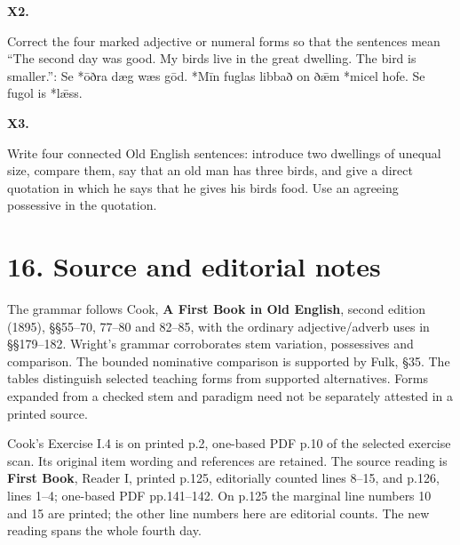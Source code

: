 \par\begin{minipage}{\linewidth}\raggedright
\textbf{X2.}

Correct the four marked adjective or numeral forms so that the sentences mean “The second day was good. My birds live in the great dwelling. The bird is smaller.”: Se *ōðra dæg wæs gōd. *Mīn fuglas libbað on ðǣm *micel hofe. Se fugol is *lǣss.

\end{minipage}\par\addvspace{4pt}

\par\begin{minipage}{\linewidth}\raggedright
\textbf{X3.}

Write four connected Old English sentences: introduce two dwellings of unequal size, compare them, say that an old man has three birds, and give a direct quotation in which he says that he gives his birds food. Use an agreeing possessive in the quotation.

\end{minipage}\par\addvspace{4pt}

\clearpage
\section*{16. Source and editorial notes}

\begingroup\fontsize{10}{12.8}\selectfont
The grammar follows Cook, \textbf{A First Book in Old English}, second edition (1895), §§55–70, 77–80 and 82–85, with the ordinary adjective/\allowbreak{}adverb uses in §§179–182. Wright’s grammar corroborates stem variation, possessives and comparison. The bounded nominative comparison is supported by Fulk, §35. The tables distinguish selected teaching forms from supported alternatives. Forms expanded from a checked stem and paradigm need not be separately attested in a printed source.

Cook’s Exercise I.4 is on printed p.2, one-based PDF p.10 of the selected exercise scan. Its original item wording and references are retained. The source reading is \textbf{First Book}, Reader I, printed p.125, editorially counted lines 8–15, and p.126, lines 1–4; one-based PDF pp.141–142. On p.125 the marginal line numbers 10 and 15 are printed; the other line numbers here are editorial counts. The new reading spans the whole fourth day.

